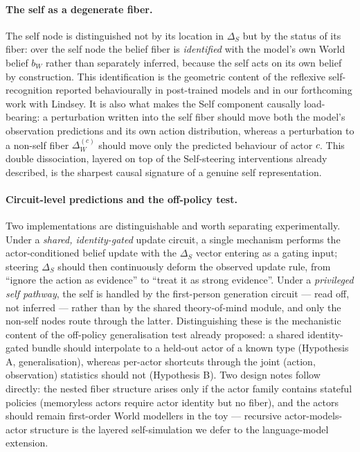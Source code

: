 \paragraph{The self as a degenerate fiber.} The self node is distinguished not by its
location in $\Delta_S$ but by the status of its fiber: over the self node the belief
fiber is \emph{identified} with the model's own World belief $b_W$ rather than separately
inferred, because the self acts on its own belief by construction. This identification is
the geometric content of the reflexive self-recognition reported behaviourally in
post-trained models \citep{betley2025tellme,panickssery2024self} and in our forthcoming
work with Lindsey. It is also what makes the Self component causally load-bearing: a
perturbation written into the self fiber should move both the model's observation
predictions and its own action distribution, whereas a perturbation to a non-self fiber
$\Delta_W^{(c)}$ should move only the predicted behaviour of actor $c$. This double
dissociation, layered on top of the Self-steering interventions already described, is the
sharpest causal signature of a genuine self representation.

\paragraph{Circuit-level predictions and the off-policy test.} Two implementations are
distinguishable and worth separating experimentally. Under a \emph{shared, identity-gated}
update circuit, a single mechanism performs the actor-conditioned belief update with the
$\Delta_S$ vector entering as a gating input; steering $\Delta_S$ should then continuously
deform the observed update rule, from ``ignore the action as evidence'' to ``treat it as
strong evidence''. Under a \emph{privileged self pathway}, the self is handled by the
first-person generation circuit --- read off, not inferred --- rather than by the shared
theory-of-mind module, and only the non-self nodes route through the latter.
Distinguishing these is the mechanistic content of the off-policy generalisation test
already proposed: a shared identity-gated bundle should interpolate to a held-out actor
of a known type (Hypothesis A, generalisation), whereas per-actor shortcuts through the
joint (action, observation) statistics should not (Hypothesis B). Two design notes follow
directly: the nested fiber structure arises only if the actor family contains stateful
policies (memoryless actors require actor identity but no fiber), and the actors should
remain first-order World modellers in the toy --- recursive actor-models-actor structure
is the layered self-simulation we defer to the language-model extension.
